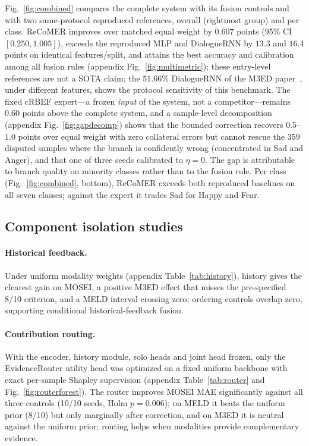 \documentclass[10pt,twocolumn,letterpaper]{article}
\begin{document}
Fig.~\ref{fig:combined} compares the complete system with its fusion controls and with two same-protocol reproduced references, overall (rightmost group) and per class.
ReCoMER improves over matched equal weight by $0.607$ points (95\% CI $[0.250, 1.005]$), exceeds the reproduced MLP and DialogueRNN by $13.3$ and $16.4$ points on identical features/split, and attains the best accuracy and calibration among all fusion rules (appendix Fig.~\ref{fig:multimetric}); these entry-level references are not a SOTA claim; the $51.66$\% DialogueRNN of the M3ED paper~\cite{zhao2022m3ed}, under different features, shows the protocol sensitivity of this benchmark.
The fixed cRBEF expert---a frozen \emph{input} of the system, not a competitor---remains $0.60$ points above the complete system, and a sample-level decomposition (appendix Fig.~\ref{fig:gapdecomp}) shows that the bounded correction recovers $0.5$--$1.0$ points over equal weight with zero collateral errors but cannot rescue the $359$ disputed samples where the branch is confidently wrong (concentrated in Sad and Anger), and that one of three seeds calibrated to $\eta{=}0$.
The gap is attributable to branch quality on minority classes rather than to the fusion rule.
Per class (Fig.~\ref{fig:combined}, bottom), ReCoMER exceeds both reproduced baselines on all seven classes; against the expert it trades Sad for Happy and Fear.



\subsection{Component isolation studies}
\label{sec:isolation}



\paragraph{Historical feedback.}
Under uniform modality weights (appendix Table~\ref{tab:history}), history gives the clearest gain on MOSEI, a positive M3ED effect that misses the pre-specified 8/10 criterion, and a MELD interval crossing zero; ordering controls overlap zero, supporting conditional historical-feedback fusion.



\paragraph{Contribution routing.}
With the encoder, history module, solo heads and joint head frozen, only the EvidenceRouter utility head was optimized on a fixed uniform backbone with exact per-sample Shapley supervision (appendix Table~\ref{tab:router} and Fig.~\ref{fig:routerforest}).
The router improves MOSEI MAE significantly against all three controls (10/10 seeds, Holm $p{=}0.006$); on MELD it beats the uniform prior (8/10) but only marginally after correction, and on M3ED it is neutral against the uniform prior; routing helps when modalities provide complementary evidence.
\end{document}

